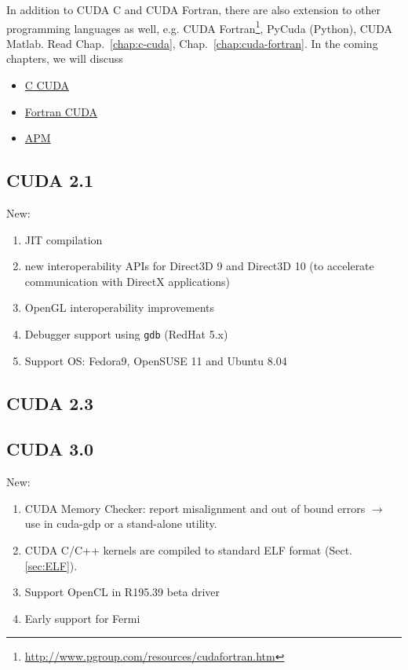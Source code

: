 In addition to CUDA C and CUDA Fortran, there are also extension to
other programming languages as well, e.g. CUDA
Fortran\footnote{\url{http://www.pgroup.com/resources/cudafortran.htm}},
PyCuda (Python), CUDA Matlab. Read Chap.~\ref{chap:c-cuda},
Chap.~\ref{chap:cuda-fortran}.  In the coming chapters, we will
discuss
\begin{itemize}
\item \hyperref[chap:c-cuda]{C CUDA}
\item \hyperref[chap:cuda-fortran]{Fortran CUDA}
\item \hyperref[chap:accel-progr-model]{APM}
\end{itemize}

\subsection{CUDA 2.1}

New:
\begin{enumerate}
  \item JIT compilation
  \item new interoperability APIs for Direct3D 9 and Direct3D 10 (to accelerate
  communication with DirectX applications)
  \item OpenGL interoperability improvements
  \item Debugger support using \verb!gdb! (RedHat 5.x)
  \item Support OS: Fedora9, OpenSUSE 11 and Ubuntu 8.04
\end{enumerate}

\subsection{CUDA 2.3}
\label{sec:CUDA_2.3}

\subsection{CUDA 3.0}
\label{sec:CUDA_3.0}

New:
\begin{enumerate}
\item CUDA Memory Checker: report misalignment and out of bound errors
  $\rightarrow$ use in cuda-gdp or a stand-alone utility. 

\item CUDA C/C++ kernels are compiled to standard ELF format (Sect.\ref{sec:ELF}). 

\item Support OpenCL in R195.39 beta driver

\item Early support for Fermi
\end{enumerate}

